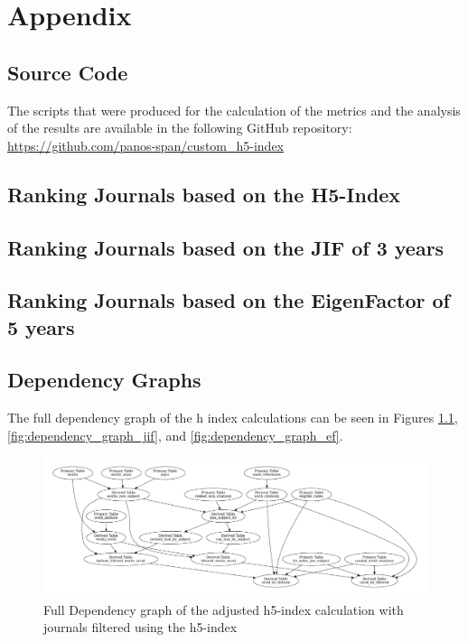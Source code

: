 \chapter{Appendix}
\label{ch:appendix}

\section{Source Code}

The scripts that were produced for the calculation of the metrics and the
analysis of the results are available in the following GitHub repository:
\url{
    https://github.com/panos-span/custom_h5-index
}

\section{Ranking Journals based on the H5-Index}



\section{Ranking Journals based on the JIF of 3 years}

\section{Ranking Journals based on the EigenFactor of 5 years}



\section{Dependency Graphs}
The full dependency graph of the h index calculations can be seen
in Figures \ref{fig:dependency_graph_h5}, \ref{fig:dependency_graph_jif},
and \ref{fig:dependency_graph_ef}.

\begin{figure}[H]
    \centering
    \includegraphics[width=\textwidth]{../figs/full-graph_h5.pdf}
    \caption{Full Dependency graph of the adjusted h5-index calculation with journals filtered using the h5-index}
    \label{fig:dependency_graph_h5}
\end{figure}

